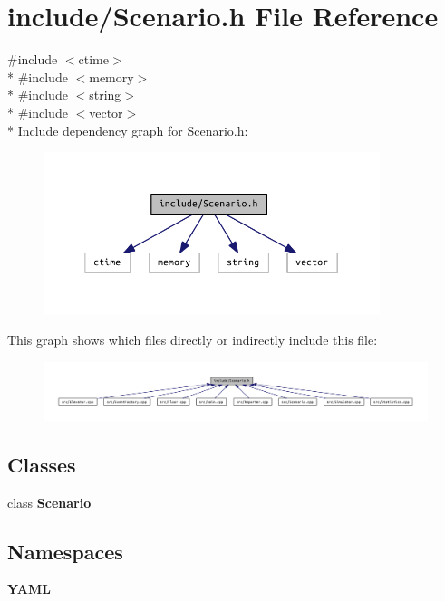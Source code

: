 \section{include/\+Scenario.h File Reference}
\label{_scenario_8h}
{\ttfamily \#include $<$ctime$>$}\\*
{\ttfamily \#include $<$memory$>$}\\*
{\ttfamily \#include $<$string$>$}\\*
{\ttfamily \#include $<$vector$>$}\\*
Include dependency graph for Scenario.\+h\+:
\nopagebreak
\begin{figure}[H]
\begin{center}
\leavevmode
\includegraphics[width=278pt]{_scenario_8h__incl}
\end{center}
\end{figure}
This graph shows which files directly or indirectly include this file\+:
\nopagebreak
\begin{figure}[H]
\begin{center}
\leavevmode
\includegraphics[width=350pt]{_scenario_8h__dep__incl}
\end{center}
\end{figure}
\subsection*{Classes}
\begin{DoxyCompactItemize}
\item 
class {\bf Scenario}
\end{DoxyCompactItemize}
\subsection*{Namespaces}
\begin{DoxyCompactItemize}
\item 
 {\bf Y\+A\+M\+L}
\end{DoxyCompactItemize}
